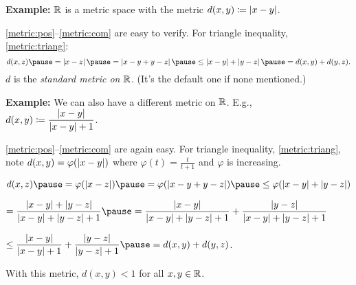 \documentclass[10pt,aspectratio=169]{beamer}
\begin{document}
\begin{frame}

\textbf{Example:}
${\mathbb{R}}$ is a metric space with the metric
\quad $d(x,y) \coloneqq \left\lvert {x-y} \right\rvert$.

\pause
\eqref{metric:pos}--\eqref{metric:com} are easy to verify.
\pause
\quad
For triangle inequality, \eqref{metric:triang}:
\begin{equation*}
d(x,z)
\pause
= \abs{x-z}
\pause
= 
\abs{x-y+y-z}
\pause
\leq
\abs{x-y}+\abs{y-z}
\pause
=
d(x,y)+ d(y,z) .
\end{equation*}
\pause
$d$ is the \emph{standard metric on ${\mathbb{R}}$}.
\pause
\quad (It's the default one if none mentioned.)

\pause
\medskip

\textbf{Example:}
We can also have a different metric on ${\mathbb{R}}$.
\pause
E.g.,
~
$
d(x,y)
\coloneqq
\dfrac{\left\lvert {x-y} \right\rvert}{\left\lvert {x-y} \right\rvert+1}$.

\pause
\eqref{metric:pos}--\eqref{metric:com} are again easy.
\pause
\quad
For triangle inequality, \eqref{metric:triang},
note 
$d(x,y) = \varphi(\left\lvert {x-y} \right\rvert)$ where $\varphi(t) = \frac{t}{t+1}$ and
$\varphi$ is increasing.

\pause
\medskip

$
d(x,z)
\pause
=
\varphi(\abs{x-z})
\pause
= 
\varphi(\abs{x-y+y-z})
\pause
\leq
\varphi(\abs{x-y}+\abs{y-z})
$

\pause
\medskip

\qquad
$
=
\dfrac{\abs{x-y}+\abs{y-z}}{\abs{x-y}+\abs{y-z}+1}
\pause
=
\dfrac{\abs{x-y}}{\abs{x-y}+\abs{y-z}+1} +
\dfrac{\abs{y-z}}{\abs{x-y}+\abs{y-z}+1}
$

\pause
\medskip

\qquad
$
\leq
\dfrac{\abs{x-y}}{\abs{x-y}+1} +
\dfrac{\abs{y-z}}{\abs{y-z}+1}
\pause
=
d(x,y)+ d(y,z)$.

\pause
\medskip

With this metric, $d(x,y) < 1$ for all $x,y \in {\mathbb{R}}$.

\end{frame}
\end{document}
